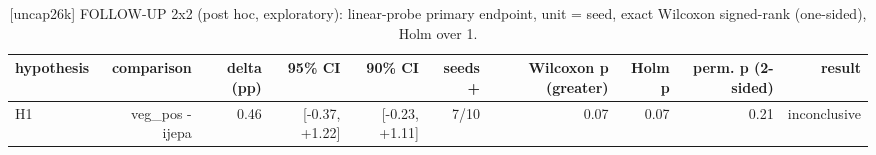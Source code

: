 \begin{table}[t]
\centering
\small
\caption{[uncap26k] FOLLOW-UP 2x2 (post hoc, exploratory): linear-probe primary endpoint, unit = seed, exact Wilcoxon signed-rank (one-sided), Holm over 1.}
\label{tab:primary_comparisons}
\begin{tabular}{lrrrrrrrrr}
\toprule
hypothesis & comparison & delta (pp) & 95\% CI & 90\% CI & seeds + & Wilcoxon p (greater) & Holm p & perm. p (2-sided) & result \\
\midrule
H1 & veg\_pos - ijepa & 0.46 & [-0.37, +1.22] & [-0.23, +1.11] & 7/10 & 0.07 & 0.07 & 0.21 & inconclusive \\
\bottomrule
\end{tabular}
\end{table}
